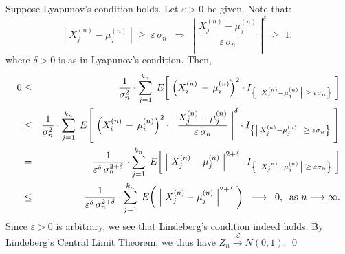 \proof
Suppose Lyapunov's condition holds.
Let $\varepsilon > 0$ be given.
Note that:
\begin{equation*}
\left\vert\; X^{(n)}_{j} - \mu^{(n)}_{j} \;\right\vert \;\geq\; \varepsilon\,\sigma_{n}
\;\;\Longrightarrow\;\;
\left\vert\; \dfrac{X^{(n)}_{j} - \mu^{(n)}_{j}}{\varepsilon\,\sigma_{n}} \;\right\vert^{\delta} \;\geq\; 1,
\end{equation*}
where $\delta > 0$ is as in Lyapunov's condition.
Then,
\begin{eqnarray*}
0
&\leq& \dfrac{1}{\sigma^{2}_{n}}\cdot
\sum_{j=1}^{k_{n}}\;
E\!\left[\;
\left(X^{(n)}_{i} \, - \, \mu^{(n)}_{i}\right)^{2}\cdot I_{\left\{\left\vert\,X^{(n)}_{j} - \mu^{(n)}_{j}\,\right\vert\;\geq\;\varepsilon\sigma_{n}\right\}}
\;\right]
\\
&\leq&
\dfrac{1}{\sigma^{2}_{n}}\cdot
\sum_{j=1}^{k_{n}}\;
E\!\left[\;
\left(X^{(n)}_{i} \, - \, \mu^{(n)}_{i}\right)^{2}
\cdot \left\vert\; \dfrac{X^{(n)}_{j} - \mu^{(n)}_{j}}{\varepsilon\,\sigma_{n}} \;\right\vert^{\delta}
\cdot I_{\left\{\left\vert\,X^{(n)}_{j} - \mu^{(n)}_{j}\,\right\vert\;\geq\;\varepsilon\sigma_{n}\right\}}
\;\right]
\\
&=&
\dfrac{1}{\varepsilon^{\delta}\,\sigma^{2+\delta}_{n}}\cdot
\sum_{j=1}^{k_{n}}\;
E\!\left[\;
\left\vert\; X^{(n)}_{j} - \mu^{(n)}_{j} \;\right\vert^{2 + \delta}
\cdot I_{\left\{\left\vert\,X^{(n)}_{j} - \mu^{(n)}_{j}\,\right\vert\;\geq\;\varepsilon\sigma_{n}\right\}}
\;\right]
\\
&\leq&
\dfrac{1}{\varepsilon^{\delta}\,\sigma^{2+\delta}_{n}}\cdot
\sum_{j=1}^{k_{n}}\;
E\!\left(\;
\left\vert\; X^{(n)}_{j} - \mu^{(n)}_{j} \;\right\vert^{2 + \delta}
\;\right)
\;\;\longrightarrow\;\; 0, \;\;\textnormal{as $n \longrightarrow \infty$}.
\end{eqnarray*}
Since $\varepsilon > 0$ is arbitrary, we see that Lindeberg's condition indeed holds.
By Lindeberg's Central Limit Theorem, we thus have $Z_{n} \overset{\mathcal{L}}{\longrightarrow} N(0,1)$.
\qed

